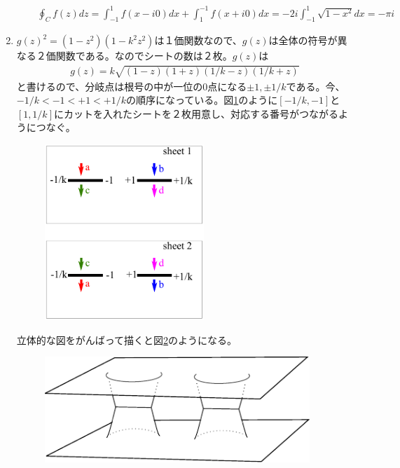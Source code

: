 \documentclass[report,paper=a4, fontsize=12pt, line_length=16cm, number_of_lines=33,dvipdfmx]{jlreq}
\numberwithin{equation}{section}
\begin{document}
\begin{enumerate}
\begin{enumerate}
  \begin{align*}
    \oint_{C}f(z)dz=\int_{-1}^{1}f(x-i0)dx+\int_{1}^{-1}f(x+i0)dx
    =-2i\int_{-1}^{1}\sqrt{1-x^2}dx
    =-\pi i
  \end{align*}
  \end{enumerate}
  \item $g(z)^2=(1-z^2)(1-k^2z^2)$は１価関数なので、$g(z)$は全体の符号が異なる２価関数である。なのでシートの数は２枚。$g(z)$は
  \begin{align*}
    g(z)=k\sqrt{(1-z)(1+z)(1/k-z)(1/k+z)}
  \end{align*}
  と書けるので、分岐点は根号の中が一位の$0$点になる$\pm 1,\pm 1/k$である。今、$-1/k < -1<+1<+1/k$の順序になっている。図\ref{torus1}のように$[-1/k,-1]$と$[1,1/k]$にカットを入れたシートを２枚用意し、対応する番号がつながるようにつなぐ。
  \begin{figure}[htbp]
    \centering
    \includegraphics[width=6cm]{trus1.pdf}
    \caption{}
    \label{torus1}
  \end{figure}
  立体的な図をがんばって描くと図\ref{surfaceex}のようになる。
  \begin{figure}[htbp]
    \centering
    \includegraphics[width=10cm]{surface.pdf}
    \caption{}
    \label{surfaceex}
  \end{figure}
\end{enumerate}
\end{document}
